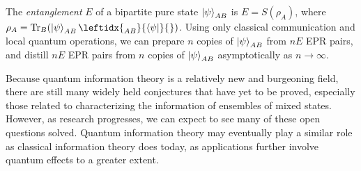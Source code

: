 \documentclass[a4paper, 12pt]{article}
\numberwithin{equation}{section}
\numberwithin{figure}{section}
\theoremstyle{definition}
\begin{document}
    The \textit{entanglement} $E$ of a bipartite pure state $\ket\psi_{AB}$ is $E = S(\rho_A)$, where $\rho_A = \text{Tr}_B(\ket{\psi}_{AB} \leftidx{_{AB}^{}}{\bra{\psi}}{_{}^{}})$. Using only classical communication and local quantum operations, we can prepare $n$ copies of $\ket{\psi}_{AB}$ from $nE$ EPR pairs, and distill $nE$ EPR pairs from $n$ copies of $\ket{\psi}_{AB}$ asymptotically as $n \to \infty$. \par
    Because quantum information theory is a relatively new and burgeoning field, there are still many widely held conjectures that have yet to be proved, especially those related to characterizing the information of ensembles of mixed states. However, as research progresses, we can expect to see many of these open questions solved. Quantum information theory may eventually play a similar role as classical information theory does today, as applications further involve quantum effects to a greater extent.

    
    
\end{document}
